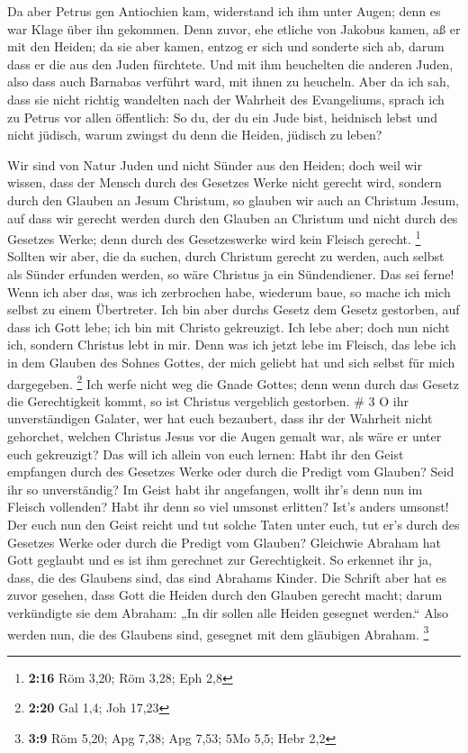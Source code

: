  Da aber Petrus gen Antiochien kam, widerstand ich ihm
unter Augen; denn es war Klage über ihn gekommen.  Denn
zuvor, ehe etliche von Jakobus kamen, aß er mit den Heiden; da sie aber
kamen, entzog er sich und sonderte sich ab, darum dass er die aus den
Juden fürchtete.  Und mit ihm heuchelten die anderen
Juden, also dass auch Barnabas verführt ward, mit ihnen zu heucheln.
 Aber da ich sah, dass sie nicht richtig wandelten nach
der Wahrheit des Evangeliums, sprach ich zu Petrus vor allen öffentlich:
So du, der du ein Jude bist, heidnisch lebst und nicht jüdisch, warum
zwingst du denn die Heiden, jüdisch zu leben?

 Wir sind von Natur Juden und nicht Sünder aus den
Heiden;  doch weil wir wissen, dass der Mensch durch des
Gesetzes Werke nicht gerecht wird, sondern durch den Glauben an Jesum
Christum, so glauben wir auch an Christum Jesum, auf dass wir gerecht
werden durch den Glauben an Christum und nicht durch des Gesetzes Werke;
denn durch des Gesetzeswerke wird kein Fleisch gerecht. \footnote{\textbf{2:16}
  Röm 3,20; Röm 3,28; Eph 2,8}  Sollten wir aber, die da
suchen, durch Christum gerecht zu werden, auch selbst als Sünder
erfunden werden, so wäre Christus ja ein Sündendiener. Das sei ferne!
 Wenn ich aber das, was ich zerbrochen habe, wiederum
baue, so mache ich mich selbst zu einem Übertreter.  Ich
bin aber durchs Gesetz dem Gesetz gestorben, auf dass ich Gott lebe; ich
bin mit Christo gekreuzigt.  Ich lebe aber; doch nun
nicht ich, sondern Christus lebt in mir. Denn was ich jetzt lebe im
Fleisch, das lebe ich in dem Glauben des Sohnes Gottes, der mich geliebt
hat und sich selbst für mich dargegeben. \footnote{\textbf{2:20} Gal
  1,4; Joh 17,23}  Ich werfe nicht weg die Gnade Gottes;
denn wenn durch das Gesetz die Gerechtigkeit kommt, so ist Christus
vergeblich gestorben. \# 3  O ihr unverständigen Galater,
wer hat euch bezaubert, dass ihr der Wahrheit nicht gehorchet, welchen
Christus Jesus vor die Augen gemalt war, als wäre er unter euch
gekreuzigt?  Das will ich allein von euch lernen: Habt ihr
den Geist empfangen durch des Gesetzes Werke oder durch die Predigt vom
Glauben?  Seid ihr so unverständig? Im Geist habt ihr
angefangen, wollt ihr's denn nun im Fleisch vollenden? 
Habt ihr denn so viel umsonst erlitten? Ist's anders umsonst!
 Der euch nun den Geist reicht und tut solche Taten unter
euch, tut er's durch des Gesetzes Werke oder durch die Predigt vom
Glauben?  Gleichwie Abraham hat Gott geglaubt und es ist
ihm gerechnet zur Gerechtigkeit.  So erkennet ihr ja,
dass, die des Glaubens sind, das sind Abrahams Kinder. 
Die Schrift aber hat es zuvor gesehen, dass Gott die Heiden durch den
Glauben gerecht macht; darum verkündigte sie dem Abraham: „In dir sollen
alle Heiden gesegnet werden.``  Also werden nun, die des
Glaubens sind, gesegnet mit dem gläubigen Abraham. \footnote{\textbf{3:9}
  Röm 5,20; Apg 7,38; Apg 7,53; 5Mo 5,5; Hebr 2,2}

